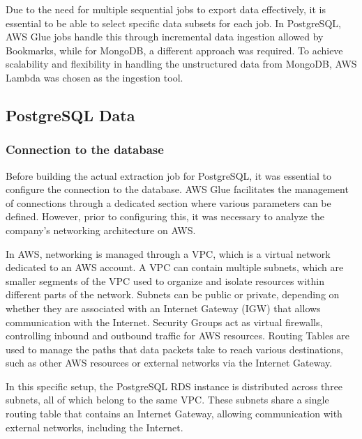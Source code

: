 Due to the need for multiple sequential jobs to export data effectively, it is essential to be able to select specific data subsets for each job. In PostgreSQL, \ac{AWS} Glue jobs handle this through incremental data ingestion allowed by Bookmarks, while for MongoDB, a different approach was required. To achieve scalability and flexibility in handling the unstructured data from MongoDB, \ac{AWS} Lambda was chosen as the ingestion tool.

\subsection{PostgreSQL Data}
\subsubsection{Connection to the database}
Before building the actual extraction job for PostgreSQL, it was essential to configure the connection to the database. \ac{AWS} Glue facilitates the management of connections through a dedicated section where various parameters can be defined. However, prior to configuring this, it was necessary to analyze the company's networking architecture on \ac{AWS}.

In \ac{AWS}, networking is managed through a \ac{VPC}, which is a virtual network dedicated to an \ac{AWS} account. A \ac{VPC} can contain multiple subnets, which are smaller segments of the \ac{VPC} used to organize and isolate resources within different parts of the network. Subnets can be public or private, depending on whether they are associated with an Internet Gateway (IGW) that allows communication with the Internet. Security Groups act as virtual firewalls, controlling inbound and outbound traffic for \ac{AWS} resources. Routing Tables are used to manage the paths that data packets take to reach various destinations, such as other \ac{AWS} resources or external networks via the Internet Gateway.

In this specific setup, the PostgreSQL \ac{RDS} instance is distributed across three subnets, all of which belong to the same \ac{VPC}. These subnets share a single routing table that contains an Internet Gateway, allowing communication with external networks, including the Internet.

